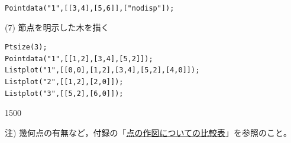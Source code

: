 \documentclass[papersize,a4paper,10pt,uplatex]{jsarticle}
\begin{document}
\begin{description}
\hspace{10mm} \verb|Pointdata("1",[[3,4],[5,6]],["nodisp"]);|



(7) 節点を明示した木を描く
\begin{verbatim}
Ptsize(3); 
Pointdata("1",[[1,2],[3,4],[5,2]]); 
Listplot("1",[[0,0],[1,2],[3,4],[5,2],[4,0]]); 
Listplot("2",[[1,2],[2,0]]); 
Listplot("3",[[5,2],[6,0]]);
\end{verbatim}

\begin{layer}{150}{0}
\end{layer}


注) 幾何点の有無など，付録の「\hyperlink{mkpttable}{点の作図についての比較表}」を参照のこと。












\end{description}
\end{document}
